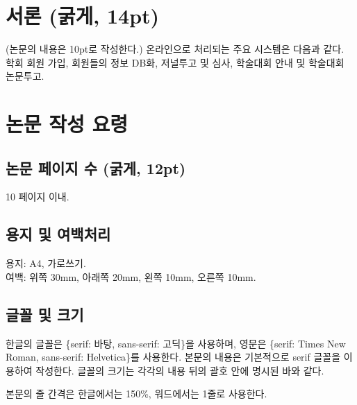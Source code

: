 \documentclass[a4paper,twocolumn]{article}
\begin{document}
\maketitle


\section{서론 (굵게, 14pt)}
\label{sec:introduction}
(논문의 내용은 10pt로 작성한다.)
온라인으로 처리되는 주요 시스템은 다음과 같다.
학회 회원 가입, 회원들의 정보 DB화, 저널투고 및 심사, 
학술대회 안내 및 학술대회 논문투고.


\section{논문 작성 요령}
\label{sec:paper_writing_technique}


\subsection{논문 페이지 수 (굵게, 12pt)}
\label{subsec:paper_page_num}

10 페이지 이내.


\subsection{용지 및 여백처리}
\label{subsec:paper_and_margin}

용지: A4, 가로쓰기. \\
여백: 위쪽 30mm, 아래쪽 20mm, 왼쪽 10mm, 오른쪽 10mm.


\subsection{글꼴 및 크기}
\label{subsec:paper_font}

한글의 글꼴은 \{serif: 바탕, sans-serif: 고딕\}을 사용하며, 
영문은 \{serif: Times New Roman, sans-serif: Helvetica\}를 사용한다. 
본문의 내용은 기본적으로 serif 글꼴을 이용하여 작성한다.
글꼴의 크기는 각각의 내용 뒤의 괄호 안에 명시된 바와 같다.

본문의 줄 간격은 한글에서는 150\%, 워드에서는 1줄로 사용한다.
\end{document}
